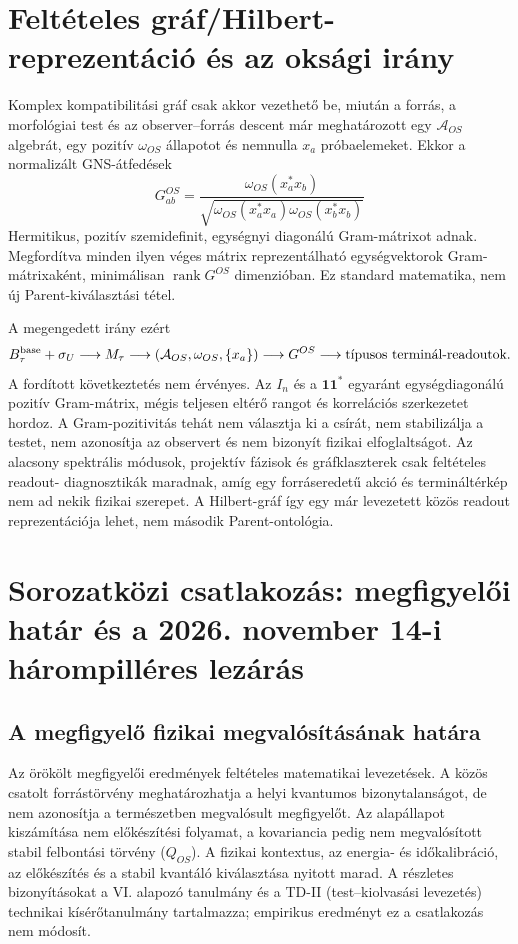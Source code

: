 \documentclass[12pt]{article}
\begin{document}
\section{Feltételes gráf/Hilbert-reprezentáció és az oksági irány}

Komplex kompatibilitási gráf csak akkor vezethető be, miután a forrás, a
morfológiai test és az observer--forrás descent már meghatározott egy
$\mathcal A_{OS}$ algebrát, egy pozitív $\omega_{OS}$ állapotot és nemnulla
$x_a$ próbaelemeket. Ekkor a normalizált GNS-átfedések
\begin{equation}
 G^{OS}_{ab}=
 \frac{\omega_{OS}(x_a^*x_b)}
 {\sqrt{\omega_{OS}(x_a^*x_a)\omega_{OS}(x_b^*x_b)}}
\end{equation}
Hermitikus, pozitív szemidefinit, egységnyi diagonálú Gram-mátrixot adnak.
Megfordítva minden ilyen véges mátrix reprezentálható egységvektorok
Gram-mátrixaként, minimálisan $\operatorname{rank}G^{OS}$ dimenzióban. Ez
standard matematika, nem új Parent-kiválasztási tétel.

A megengedett irány ezért
\[
 B_\tau^{\rm base}+\sigma_U
 \longrightarrow M_\tau
 \longrightarrow (\mathcal A_{OS},\omega_{OS},\{x_a\})
 \longrightarrow G^{OS}
 \longrightarrow \hbox{típusos terminál-readoutok}.
\]
A fordított következtetés nem érvényes. Az $I_n$ és a
$\mathbf1\mathbf1^*$ egyaránt egységdiagonálú pozitív Gram-mátrix, mégis
teljesen eltérő rangot és korrelációs szerkezetet hordoz. A Gram-pozitivitás
tehát nem választja ki a csírát, nem stabilizálja a testet, nem azonosítja az
observert és nem bizonyít fizikai elfoglaltságot. Az alacsony spektrális
módusok, projektív fázisok és gráfklaszterek csak feltételes readout-
diagnosztikák maradnak, amíg egy forráseredetű akció és termináltérkép nem
ad nekik fizikai szerepet. A Hilbert-gráf így egy már levezetett közös
readout reprezentációja lehet, nem második Parent-ontológia.

\section{Sorozatközi csatlakozás: megfigyelői határ és a 2026. november 14-i hárompilléres lezárás}
\label{sec:downstream-hu-interface}

\subsection{A megfigyelő fizikai megvalósításának határa}
\label{sec:observer-update-hu-20260914}
Az örökölt megfigyelői eredmények feltételes matematikai levezetések. A közös csatolt forrástörvény meghatározhatja a helyi kvantumos bizonytalanságot, de nem azonosítja a természetben megvalósult megfigyelőt. Az alapállapot kiszámítása nem előkészítési folyamat, a kovariancia pedig nem megvalósított stabil felbontási törvény ($Q_{OS}$). A fizikai kontextus, az energia- és időkalibráció, az előkészítés és a stabil kvantáló kiválasztása nyitott marad. A részletes bizonyításokat a VI. alapozó tanulmány és a TD-II (test--kiolvasási levezetés) technikai kísérőtanulmány tartalmazza; empirikus eredményt ez a csatlakozás nem módosít.
\end{document}
